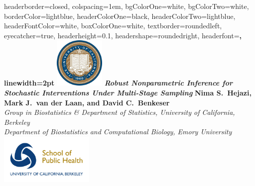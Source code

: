\documentclass[landscape,a0paper,fontscale=0.285]{baposter} %
\begin{document}
\begin{poster} {
headerborder=closed, %
colspacing=1em, %
bgColorOne=white, %
bgColorTwo=white, %
borderColor=lightblue, %
headerColorOne=black, %
headerColorTwo=lightblue, %
headerFontColor=white, %
boxColorOne=white, %
textborder=roundedleft, %
eyecatcher=true, %
headerheight=0.1\textheight, %
headershape=roundedright, %
headerfont=\Large\bf\textsc, %
linewidth=2pt %
}
%
{\includegraphics[height=6.5em]{logo_cal.jpg}} %
{\bf\textit{\LARGE Robust Nonparametric Inference for Stochastic Interventions
    Under Multi-Stage Sampling}\vspace{0.01em}} %
{\textbf{Nima S.~Hejazi, Mark J.~van der Laan, and David C.~Benkeser} \\
  \textit{Group in Biostatistics \& Department of Statistics, University of
    California, Berkeley} \\
  \textit{Department of Biostatistics and Computational Biology, Emory
    University}} %
{\includegraphics[height=6.5em]{logo_sph.jpg}} %


\end{poster}
\end{document}
